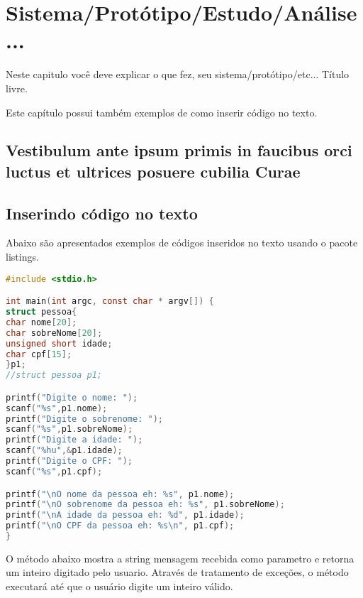 \chapter{Sistema/Protótipo/Estudo/Análise...}
Neste capitulo você deve explicar o que fez, seu sistema/protótipo/etc... Título livre.\newline 

Este capítulo possui também exemplos de como inserir código no texto.
\section{Vestibulum ante ipsum primis in faucibus orci luctus et ultrices
posuere cubilia Curae}

\lipsum[21-22]

\section{Inserindo código no texto}

Abaixo são apresentados exemplos de códigos inseridos no texto usando o pacote listings.

\begin{lstlisting}[language=c, caption={Exemplo de código C}, upquote=true]
#include <stdio.h>

int main(int argc, const char * argv[]) {
struct pessoa{
char nome[20];
char sobreNome[20];
unsigned short idade;
char cpf[15];
}p1;
//struct pessoa p1;

printf("Digite o nome: ");
scanf("%s",p1.nome);
printf("Digite o sobrenome: ");
scanf("%s",p1.sobreNome);
printf("Digite a idade: ");
scanf("%hu",&p1.idade);
printf("Digite o CPF: ");
scanf("%s",p1.cpf);

printf("\nO nome da pessoa eh: %s", p1.nome);
printf("\nO sobrenome da pessoa eh: %s", p1.sobreNome);
printf("\nA idade da pessoa eh: %d", p1.idade);
printf("\nO CPF da pessoa eh: %s\n", p1.cpf);
}
\end{lstlisting}

\lipsum[1]




O método abaixo mostra a string mensagem recebida como parametro e retorna um inteiro digitado pelo usuario. Através de tratamento de exceções, o método executará até que o usuário digite um inteiro válido.



\lipsum[2-3]